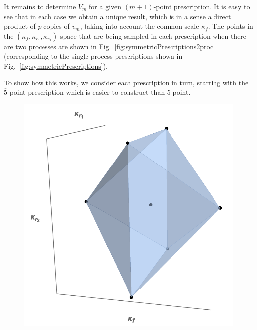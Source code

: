 It remains to determine $V_m$ for a given $(m+1)$-point prescription. It is
easy to see that in each case we obtain a unique result, which is
in a sense a direct product of $p$ copies of $v_m$, taking into account the common scale $\kappa_f$.
%
The points in the $(\kappa_f,\kappa_{r_1},\kappa_{r_2})$ space that are being
sampled in each prescription when there are two processes are shown in Fig.~\ref{fig:symmetricPrescriptions2proc} (corresponding to the single-process prescriptions shown in 
Fig.~\ref{fig:symmetricPrescriptions}). 

To show how this works, we consider each prescription 
in turn, starting with the $\overline{5}$-point prescription which is easier to construct than $5$-point.
%

\begin{figure}[t]
\centering
\includegraphics[scale=0.39]{mhous/plots//5pt_3D.png}

\end{figure}
